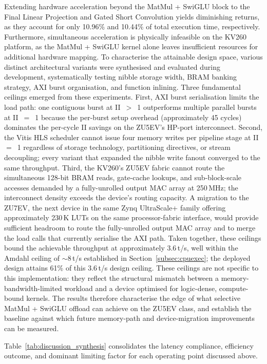 \documentclass[manuscript,]{acmart} %
\begin{document}
Extending hardware acceleration beyond the MatMul + SwiGLU block to the Final Linear Projection and Gated Short Convolution yields diminishing returns, as they account for only 10.96\% and 10.44\% of total execution time, respectively. Furthermore, simultaneous acceleration is physically infeasible on the KV260 platform, as the MatMul + SwiGLU kernel alone leaves insufficient resources for additional hardware mapping.
To characterise the attainable design space, various distinct architectural variants were synthesised and evaluated during
development, systematically testing nibble storage width, BRAM banking strategy,
AXI burst organisation, and function inlining.
Three fundamental ceilings emerged from these experiments.
First, AXI burst serialisation limits the load path: one contiguous burst at
II~$>$~1 outperforms multiple parallel bursts at II~$=$~1 because the per-burst
setup overhead (approximately 45 cycles) dominates the per-cycle II savings on the
ZU5EV's HP-port interconnect.
Second, the Vitis HLS scheduler cannot issue four memory writes per pipeline
stage at II~$=$~1 regardless of storage technology, partitioning directives, or
stream decoupling; every variant that expanded the nibble write fanout converged to
the same throughput.
Third, the KV260's ZU5EV fabric cannot route the simultaneous 128-bit BRAM reads,
gate-cache lookups, and sub-block-scale accesses demanded by a fully-unrolled output
MAC array at 250\,MHz; the interconnect density exceeds the device's routing
capacity.
A migration to the ZU7EV, the next device in the same Zynq UltraScale+ family
offering approximately 230\,K LUTs on the same processor-fabric interface, would
provide sufficient headroom to route the fully-unrolled output MAC array and to merge
the load calls that currently serialise the AXI path.
Taken together, these ceilings bound the achievable throughput at approximately
3.6\,t/s, well within the Amdahl ceiling of $\sim$8\,t/s established in
Section~\ref{subsec:cpuexec}; the deployed design attains 61\% of this 3.6\,t/s design ceiling.
These ceilings are not specific to this implementation: they reflect the structural mismatch between a memory-bandwidth-limited workload and a device optimised for logic-dense, compute-bound kernels. The results therefore characterise the edge of what selective MatMul + SwiGLU offload can achieve on the ZU5EV class, and establish the baseline against which future memory-path and device-migration improvements can be measured.

Table~\ref{tab:discussion_synthesis} consolidates the latency compliance, efficiency outcome, and dominant limiting factor for each operating point discussed above.
\end{document}
